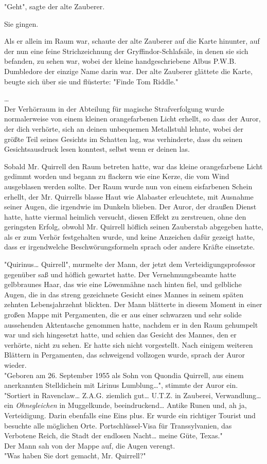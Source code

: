{"Geht", sagte der alte Zauberer.

Sie gingen.

Als er allein im Raum war, schaute der alte Zauberer auf die Karte hinunter, auf der nun eine feine Strichzeichnung der Gryffindor-Schlafsäle, in denen sie sich befanden, zu sehen war, wobei der kleine handgeschriebene Albus P.W.B. Dumbledore der einzige Name darin war. Der alte Zauberer glättete die Karte, beugte sich über sie und flüsterte: "Finde Tom Riddle."

…\\ Der Verhörraum in der Abteilung für magische Strafverfolgung wurde normalerweise von einem kleinen orangefarbenen Licht erhellt, so dass der Auror, der dich verhörte, sich an deinen unbequemen Metallstuhl lehnte, wobei der größte Teil seines Gesichts im Schatten lag, was verhinderte, dass du seinen Gesichtsausdruck lesen konntest, selbst wenn er deinen las.

Sobald Mr. Quirrell den Raum betreten hatte, war das kleine orangefarbene Licht gedimmt worden und begann zu flackern wie eine Kerze, die vom Wind ausgeblasen werden sollte. Der Raum wurde nun von einem eisfarbenen Schein erhellt, der Mr. Quirrells blasse Haut wie Alabaster erleuchtete, mit Ausnahme seiner Augen, die irgendwie im Dunkeln blieben. Der Auror, der draußen Dienst hatte, hatte viermal heimlich versucht, diesen Effekt zu zerstreuen, ohne den geringsten Erfolg, obwohl Mr. Quirrell höflich seinen Zauberstab abgegeben hatte, als er zum Verhör festgehalten wurde, und keine Anzeichen dafür gezeigt hatte, dass er irgendwelche Beschwörungsformeln sprach oder andere Kräfte einsetzte.

"Quirinus… Quirrell", murmelte der Mann, der jetzt dem Verteidigungsprofessor gegenüber saß und höflich gewartet hatte. Der Vernehmungsbeamte hatte gelbbraunes Haar, das wie eine Löwenmähne nach hinten fiel, und gelbliche Augen, die in das streng gezeichnete Gesicht eines Mannes in seinem späten zehnten Lebensjahrzehnt blickten. Der Mann blätterte in diesem Moment in einer großen Mappe mit Pergamenten, die er aus einer schwarzen und sehr solide aussehenden Aktentasche genommen hatte, nachdem er in den Raum gehumpelt war und sich hingesetzt hatte, und schien das Gesicht des Mannes, den er verhörte, nicht zu sehen. Er hatte sich nicht vorgestellt. Nach einigem weiteren Blättern in Pergamenten, das schweigend vollzogen wurde, sprach der Auror wieder.\\ "Geboren am 26. September 1955 als Sohn von Quondia Quirrell, aus einem anerkannten Stelldichein mit Lirinus Lumblung…", stimmte der Auror ein. "Sortiert in Ravenclaw… Z.A.G. ziemlich gut… U.T.Z. in Zauberei, Verwandlung… ein \emph{Ohnegleichen} in Muggelkunde, beeindruckend… Antike Runen und, ah ja, Verteidigung. Darin ebenfalls eine Eins plus. Er wurde ein richtiger Tourist und besuchte alle möglichen Orte. Portschlüssel-Visa für Transsylvanien, das Verbotene Reich, die Stadt der endlosen Nacht… meine Güte, Texas."\\ Der Mann sah von der Mappe auf, die Augen verengt.\\ "Was haben Sie dort gemacht, Mr. Quirrell?"

}

